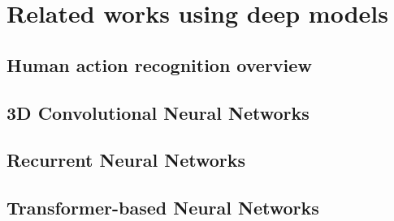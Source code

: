 \section{Related works using deep models}
\label{sec:Related works using deep models}
\subsection{Human action recognition overview}
\citet{wu2017recent}

\citet{chen2020monocular}

\subsection{3D Convolutional Neural Networks}
\citet{baccouche2011sequential}

\citet{ji20123d}

\subsection{Recurrent Neural Networks}
\citet{yue2015beyond}

\citet{donahue2015long}

\citet{jaouedi2020new}

\subsection{Transformer-based Neural Networks}

\citet{sun2019learning}

\citet{neimark2021video}
